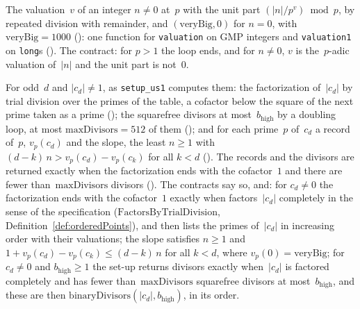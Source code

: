 \begin{definition}\label{def:valuation}
  \leanok
  The valuation~$v$ of an integer $n \ne 0$ at~$p$ with the unit part $(|n| / p^v) \bmod p$, by
  repeated division with remainder, and $(\mathrm{veryBig}, 0)$ for $n = 0$, with
  $\mathrm{veryBig} = 1000$ (): one function for \verb|valuation|
  on GMP integers and \verb|valuation1| on \verb|long|s (). The
  contract: for $p > 1$ the loop ends, and for $n \ne 0$, $v$ is the~$p$-adic valuation of~$|n|$
  and the unit part is not~$0$.
\end{definition}

\begin{definition}\label{def:setupUs1}
  \leanok
  For odd~$d$ and $|c_d| \ne 1$, as \verb|setup_us1| computes them: the factorization of~$|c_d|$ by
  trial division over the primes of the table, a cofactor below the square of the next prime taken
  as a prime (); the squarefree divisors at
  most~$b_{\mathrm{high}}$ by a doubling loop, at most $\mathrm{maxDivisors} = 512$ of them
  (); and for each prime~$p$ of~$c_d$ a record of~$p$, $v_p(c_d)$
  and the slope, the least $n \ge 1$ with $(d - k)\, n > v_p(c_d) - v_p(c_k)$ for all $k < d$
  (). The records and the divisors are returned exactly when the
  factorization ends with the cofactor~$1$ and there are fewer than~$\mathrm{maxDivisors}$ divisors
  (). The contracts say so, and: for $c_d \ne 0$ the factorization
  ends with the cofactor~$1$ exactly when \ratpoints{} factors~$|c_d|$ completely in the sense of the
  specification ($\mathrm{FactorsByTrialDivision}$, Definition~\ref{def:orderedPoints}), and then
  lists the primes of~$|c_d|$ in increasing order with their valuations; the slope satisfies
  $n \ge 1$ and $1 + v_p(c_d) - v_p(c_k) \le (d - k)\, n$ for all $k < d$, where
  $v_p(0) = \mathrm{veryBig}$; for $c_d \ne 0$ and $b_{\mathrm{high}} \ge 1$ the set-up returns
  divisors exactly when~$|c_d|$ is factored completely and has fewer than~$\mathrm{maxDivisors}$
  squarefree divisors at most~$b_{\mathrm{high}}$, and these are then
  $\mathrm{binaryDivisors}(|c_d|, b_{\mathrm{high}})$, in its order.
\end{definition}

